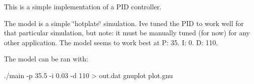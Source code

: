 This is a simple implementation of a P\+ID controller.

The model is a simple \char`\"{}hotplate\char`\"{} simulation. I\textquotesingle{}ve tuned the P\+ID to work well for that particular simulation, but note\+: it must be manually tuned (for now) for any other application. The model seems to work best at P\+: 35. I\+: 0. D\+: 110.

The model can be ran with\+: 
\begin{DoxyCode}
./main -p 35.5 -i 0.03 -d 110 > out.dat
gnuplot plot.gnu
\end{DoxyCode}
 